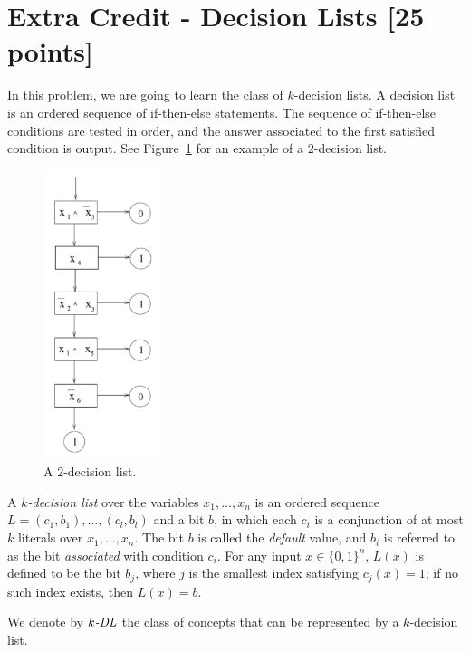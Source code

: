 \section{Extra Credit - Decision Lists [25 points]}
In this problem, we are going to learn the class of $k$-decision
lists. A decision list is an ordered sequence of if-then-else
statements. The sequence of if-then-else conditions are tested in
order, and the answer associated to the first satisfied condition is
output. See Figure~\ref{fig:decision_list} for an example of a
$2$-decision list.

\begin{figure}[h]
\begin{center}
\includegraphics[width=1.35in]{fig-1.pdf}
\caption{A $2$-decision list.}
\label{fig:decision_list}
\end{center}
\end{figure}

A {\em $k$-decision list} over the variables $x_{1}, \ldots, x_{n}$ is
an ordered sequence $L=(c_{1}, b_{1}), \ldots, (c_{l},b_{l})$ and a
bit $b$, in which each $c_{i}$ is a conjunction of at most $k$
literals over $x_{1},\ldots, x_{n}$. The bit $b$ is called the {\em
  default} value, and $b_{i}$ is referred to as the bit {\em
  associated} with condition $c_{i}$. For any input $x \in \{0,
1\}^{n}$, $L(x)$ is defined to be the bit $b_{j}$, where $j$ is the
smallest index satisfying $c_{j}(x)=1$; if no such index exists, then
$L(x)=b$.

We denote by $k\mbox{\em -DL}$ the class of concepts that can be
represented by a $k$-decision list.


